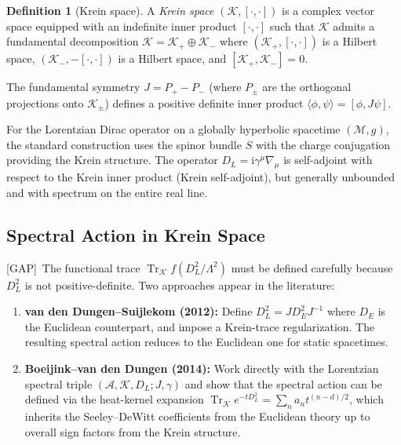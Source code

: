 \documentclass[11pt,a4paper]{article}
\theoremstyle{definition}
\newtheorem{definition}[proposition]{Definition}
\theoremstyle{remark}
\newcommand{\Tr}{\operatorname{Tr}}
\newcommand{\ii}{\mathrm{i}}
\newcommand{\gap}{\textcolor{red!80!black}{\textsf{[GAP]}}}
\begin{document}
\begin{definition}[Krein space]
A \emph{Krein space} $(\mathcal{K}, [\cdot,\cdot])$ is a complex
vector space equipped with an indefinite inner product
$[\cdot,\cdot]$ such that $\mathcal{K}$ admits a fundamental
decomposition $\mathcal{K} = \mathcal{K}_+ \oplus \mathcal{K}_-$
where $(\mathcal{K}_+, [\cdot,\cdot])$ is a Hilbert space,
$(\mathcal{K}_-, -[\cdot,\cdot])$ is a Hilbert space, and
$[\mathcal{K}_+, \mathcal{K}_-] = 0$.
\end{definition}

The fundamental symmetry $J = P_+ - P_-$ (where $P_\pm$ are the
orthogonal projections onto $\mathcal{K}_\pm$) defines a positive
definite inner product $\langle \phi, \psi\rangle = [\phi, J\psi]$.

For the Lorentzian Dirac operator on a globally hyperbolic spacetime
$(\mathcal{M}, g)$, the standard construction uses the spinor bundle
$S$ with the charge conjugation providing the Krein structure.  The
operator $D_L = \ii\gamma^\mu\nabla_\mu$ is self-adjoint with respect
to the Krein inner product (Krein self-adjoint), but generally unbounded
and with spectrum on the entire real line.

\subsection{Spectral Action in Krein Space}

\gap\ The functional trace $\Tr_{\mathcal{K}} f(D_L^2/\Lambda^2)$ must
be defined carefully because $D_L^2$ is not positive-definite.  Two
approaches appear in the literature:

\begin{enumerate}
  \item \textbf{van den Dungen--Suijlekom (2012):} Define
    $D_L^2 = J D_E^2 J^{-1}$ where $D_E$ is the Euclidean counterpart,
    and impose a Krein-trace regularization.  The resulting spectral
    action reduces to the Euclidean one for static spacetimes.
  \item \textbf{Boeijink--van den Dungen (2014):} Work directly with
    the Lorentzian spectral triple
    $(\mathcal{A}, \mathcal{K}, D_L; J, \gamma)$ and show that
    the spectral action can be defined via the heat-kernel expansion
    $\Tr_{\mathcal{K}} e^{-tD_L^2} = \sum_n a_n t^{(n-d)/2}$, which
    inherits the Seeley--DeWitt coefficients from the Euclidean theory
    up to overall sign factors from the Krein structure.
\end{enumerate}
\end{document}
